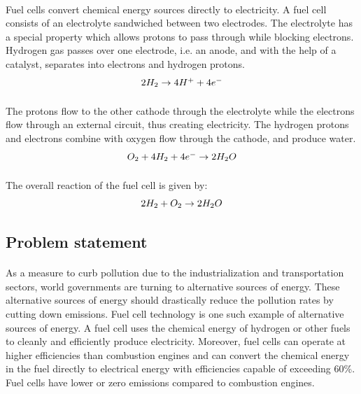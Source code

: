 \paragraph{}Fuel cells convert chemical energy sources directly to electricity. A fuel cell consists of an electrolyte sandwiched between two electrodes. The electrolyte has a special property which allows protons to pass through while blocking electrons. Hydrogen gas passes over one electrode, i.e. an anode, and with the help of a catalyst, separates into electrons and hydrogen protons.
\begin{equation}
$$2H_{2}\rightarrow 4H^{+} + 4e^{-}$$
\end{equation}
\paragraph{}The protons ﬂow to the other cathode through the electrolyte while the electrons ﬂow through an external circuit, thus creating electricity. The hydrogen protons and electrons combine with oxygen ﬂow through the cathode, and produce water.
\begin{equation}
$$O_{2}+ 4H_{2} + 4e^{-} \rightarrow 2H_{2}O $$
\end{equation}
\paragraph{}The overall reaction of the fuel cell is given by:
\begin{equation}
$$2H_{2}+ O_{2} \rightarrow 2H_{2}O $$
\end{equation}

\subsection{Problem statement}
\paragraph{}As a measure to curb pollution due to the industrialization and transportation sectors, world governments are turning to alternative sources of energy. These alternative sources of energy should drastically reduce the pollution rates by cutting down emissions. Fuel cell technology is one such example of alternative sources of energy. A fuel cell uses the chemical energy of hydrogen or other fuels to cleanly and efficiently produce electricity. Moreover, fuel cells can operate at higher efficiencies than combustion engines and can convert the chemical energy in the fuel directly to electrical energy with efficiencies capable of exceeding 60\%. Fuel cells have lower or zero emissions compared to combustion engines.
